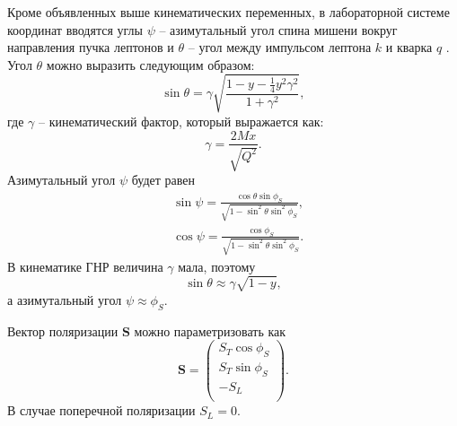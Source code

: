 \documentclass{extreport}
\begin{document}
Кроме объявленных выше кинематических переменных, в лабораторной системе координат вводятся углы $\psi$ -- азимутальный угол спина мишени вокруг направления пучка лептонов и $\theta$ -- угол между импульсом лептона $k$ и кварка $q$ \cite{Diehl}. Угол $\theta$ можно выразить следующим образом:
\begin{equation}
	\sin \theta = \gamma \sqrt{\frac{1-y-\frac{1}{4}y^2 \gamma^2}{1+\gamma^2}},
\end{equation} 
где $\gamma$ -- кинематический фактор, который выражается как:
\begin{equation}
	\gamma = \frac{2Mx}{\sqrt{Q^2}}.
\end{equation}
Азимутальный угол $\psi$ будет равен
\begin{equation}
	\begin{split}
		 & \sin \psi = \frac{\cos \theta \sin \phi_S}{\sqrt{1-\sin^2 \theta \sin^2 \phi_S}}, \\
		 & \cos \psi = \frac{\cos \phi_S}{\sqrt{1-\sin^2 \theta \sin^2 \phi_S}}.
	\end{split}
\end{equation}
В кинематике ГНР величина $\gamma$ мала, поэтому
\begin{equation}
	\sin \theta \approx \gamma \sqrt{1-y},
\end{equation}
а азимутальный угол $\psi \approx \phi_S$.

Вектор поляризации $\textbf{S}$ можно параметризовать как
\begin{equation}
	\textbf{S} = \begin{pmatrix}
			S_T \cos \phi_S \\ S_T \sin \phi_S\\ -S_L \\ 
	\end{pmatrix}.
\end{equation}
В случае поперечной поляризации $S_L = 0$.
\end{document}
